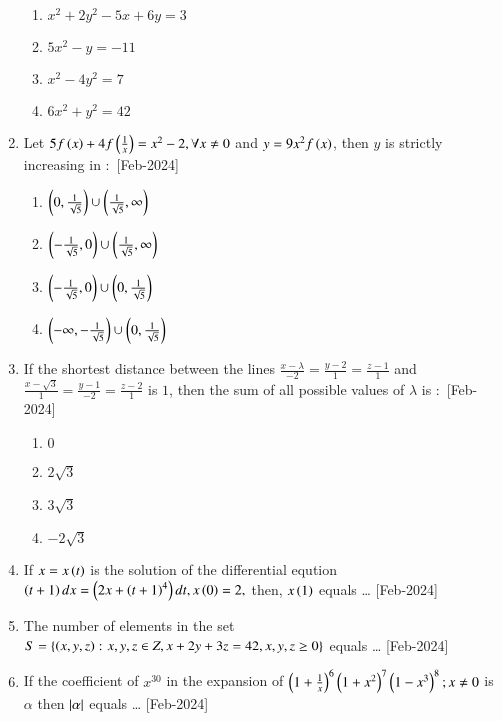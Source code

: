 \documentclass[journal]{IEEEtran}
\begin{document}
\begin{enumerate}
\begin{enumerate}
            \item $x^2+2y^2-5x+6y=3$
            \item $5x^2-y=-11$
            \item $x^2-4y^2=7$
            \item $6x^2+y^2=42$
        \end{enumerate}
    \item Let $5f\left(x\right)+4f\left(\frac{1}{x}\right)=x^2-2,\forall x\neq 0$ and $y=9x^2f\left(x\right)$, then $y$ is strictly increasing in $\colon$
    \hfill{[Feb-2024]}
        \begin{enumerate}
            \item $\left(0,\frac{1}{\sqrt{5}}\right)\cup \left(\frac{1}{\sqrt{5}},\infty\right)$
            \item $\left(-\frac{1}{\sqrt{5}},0\right)\cup \left(\frac{1}{\sqrt{5}},\infty\right)$
            \item $\left(-\frac{1}{\sqrt{5}},0\right)\cup \left(0,\frac{1}{\sqrt{5}}\right)$
            \item $\left(-\infty,-\frac{1}{\sqrt{5}}\right)\cup \left(0,\frac{1}{\sqrt{5}}\right)$
        \end{enumerate}
    \item If the shortest distance between the lines $\frac{x-\lambda}{-2}=\frac{y-2}{1}=\frac{z-1}{1}$ and $\frac{x-\sqrt{3}}{1}=\frac{y-1}{-2}=\frac{z-2}{1}$ is $1$, then the sum of all possible values of $\lambda$ is $\colon$ 
    \hfill{[Feb-2024]}
        \begin{enumerate}
            \item $0$
            \item $2\sqrt{3}$
            \item $3\sqrt{3}$
            \item $-2\sqrt{3}$
        \end{enumerate}
    \item If $x=x\left(t\right)$ is the solution of the differential eqution\\
    $\left(t+1\right)dx=\left(2x+\left(t+1\right)^4\right)dt,x\left(0\right)=2,$ then, $x\left(1\right)$ equals \dots
    \hfill{[Feb-2024]}
    \item The number of elements in the set\\
            $S=\left\{\left(x,y,z\right)\colon x,y,z\in Z,x+2y+3z=42,x,y,z\geq0\right\}$ equals \dots
            \hfill{[Feb-2024]}
    \item If the coefficient of $x^{30}$ in the expansion of $\left(1+\frac{1}{x}\right)^6\left(1+x^2\right)^7\left(1-x^3\right)^8;x\neq0$ is $\alpha$ then $\left\vert\alpha\right\vert$ equals \dots
    \hfill{[Feb-2024]}

\end{enumerate}
\end{document}
